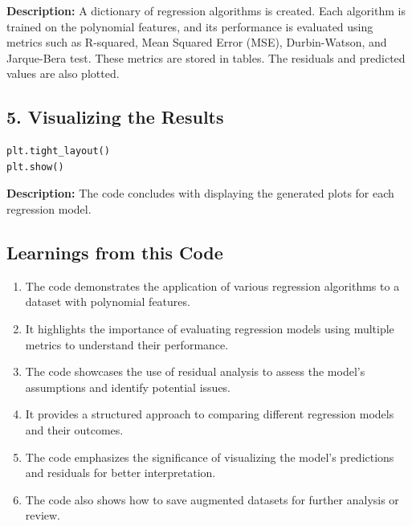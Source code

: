 \textbf{Description:} A dictionary of regression algorithms is created. Each algorithm is trained on the polynomial features, and its performance is evaluated using metrics such as R-squared, Mean Squared Error (MSE), Durbin-Watson, and Jarque-Bera test. These metrics are stored in tables. The residuals and predicted values are also plotted.

\subsection*{5. Visualizing the Results}
\begin{lstlisting}[language=Python, caption={Visualizing the Results}]
plt.tight_layout()
plt.show()
\end{lstlisting}
\textbf{Description:} The code concludes with displaying the generated plots for each regression model.

\subsection*{Learnings from this Code}

\begin{enumerate}[label=(\alph*)]
	\item The code demonstrates the application of various regression algorithms to a dataset with polynomial features.
	\item It highlights the importance of evaluating regression models using multiple metrics to understand their performance.
	\item The code showcases the use of residual analysis to assess the model's assumptions and identify potential issues.
	\item It provides a structured approach to comparing different regression models and their outcomes.
	\item The code emphasizes the significance of visualizing the model's predictions and residuals for better interpretation.
	\item The code also shows how to save augmented datasets for further analysis or review.
\end{enumerate}

\clearpage